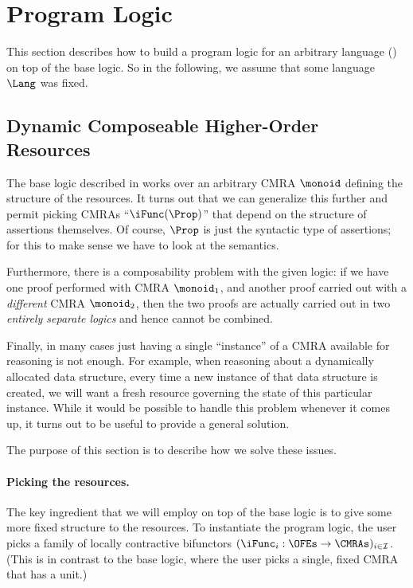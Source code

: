 
\section{Program Logic}
\label{sec:program-logic}

This section describes how to build a program logic for an arbitrary language (\cf {}) on top of the base logic.
So in the following, we assume that some language $\Lang$ was fixed.

\subsection{Dynamic Composeable Higher-Order Resources}
\label{sec:composeable-resources}

The base logic described in  works over an arbitrary CMRA $\monoid$ defining the structure of the resources.
It turns out that we can generalize this further and permit picking CMRAs ``$\iFunc(\Prop)$'' that depend on the structure of assertions themselves.
Of course, $\Prop$ is just the syntactic type of assertions; for this to make sense we have to look at the semantics.

Furthermore, there is a composability problem with the given logic: if we have one proof performed with CMRA $\monoid_1$, and another proof carried out with a \emph{different} CMRA $\monoid_2$, then the two proofs are actually carried out in two \emph{entirely separate logics} and hence cannot be combined.

Finally, in many cases just having a single ``instance'' of a CMRA available for reasoning is not enough.
For example, when reasoning about a dynamically allocated data structure, every time a new instance of that data structure is created, we will want a fresh resource governing the state of this particular instance.
While it would be possible to handle this problem whenever it comes up, it turns out to be useful to provide a general solution.

The purpose of this section is to describe how we solve these issues.

\paragraph{Picking the resources.}
The key ingredient that we will employ on top of the base logic is to give some more fixed structure to the resources.
To instantiate the program logic, the user picks a family of locally contractive bifunctors $(\iFunc_i : \OFEs \to \CMRAs)_{i \in \mathcal{I}}$.
(This is in contrast to the base logic, where the user picks a single, fixed CMRA that has a unit.)


